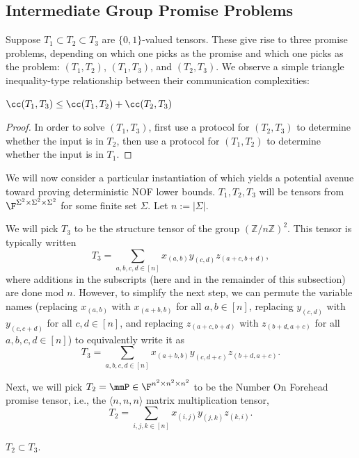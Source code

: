 \subsection{Intermediate Group Promise Problems}


Suppose $T_1 \subset T_2 \subset T_3$ are $\{0, 1\}$-valued tensors. These give rise to three promise problems, depending on which one picks as the promise and which one picks as the problem: $(T_1, T_2)$, $(T_1, T_3)$, and $(T_2, T_3)$. We observe a simple triangle inequality-type relationship between their communication complexities:

\begin{fact} \label{fact:triangleineq}
    $\cc(T_1, T_3) \leq \cc(T_1, T_2) + \cc(T_2, T_3)$
\end{fact}

\begin{proof}
    In order to solve $(T_1, T_3)$, first use a protocol for $(T_2, T_3)$ to determine whether the input is in $T_2$, then use a protocol for $(T_1, T_2)$ to determine whether the input is in $T_1$.
\end{proof}

We will now consider a particular instantiation of  which yields a potential avenue toward proving deterministic NOF lower bounds. $T_1, T_2, T_3$ will be tensors from $\F^{\Sigma^2 \times \Sigma^2 \times \Sigma^2}$ for some finite set $\Sigma$. Let $n := |\Sigma|$.

We will pick $T_3$ to be the structure tensor of the group $(\mathbb{Z} / n\mathbb{Z})^2$. This tensor is typically written
$$T_3 = \sum_{a,b,c,d \in [n]} x_{(a,b)} y_{(c,d)} z_{(a+c, b+d)},$$
where additions in the subscripts (here and in the remainder of this subsection) are done mod $n$. However, to simplify the next step, we can permute the variable names (replacing $x_{(a,b)}$ with $x_{(a+b,b)}$ for all $a,b \in [n]$, replacing $y_{(c,d)}$ with $y_{(c,c+d)}$ for all $c,d \in [n]$, and replacing $z_{(a+c, b+d)}$ with $z_{(b+d, a+c)}$ for all $a,b,c,d \in [n]$) to equivalently write it as
$$T_3 = \sum_{a,b,c,d \in [n]} x_{(a+b,b)} y_{(c,d+c)} z_{(b+d, a+c)}.$$

Next, we will pick $T_2 = \mmP \in \F^{n^2 \times n^2 \times n^2}$ to be the Number On Forehead promise tensor, i.e., the $\langle n,n,n \rangle$ matrix multiplication tensor,
$$T_2 = \sum_{i,j,k \in [n]} x_{(i,j)} y_{(j,k)} z_{(k,i)}.$$

\begin{fact}
    $T_2 \subset T_3$.
\end{fact}

